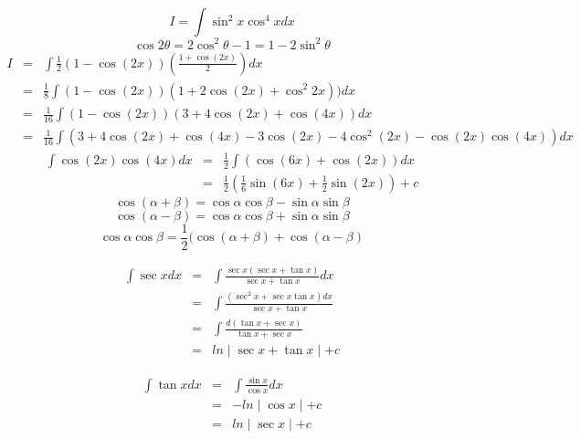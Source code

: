 \begin{eg}
$$\displaystyle I = \int \sin^2 x \cos ^4 x dx$$
$$\cos 2\theta = 2\cos^2 \theta -1 = 1-2\sin^2 \theta$$
$$\begin{array}{rcl}
I & = & \displaystyle \int \frac{1}{2} (1- \cos (2x))(\frac{1+ \cos (2x)}{2}) dx\\
& = & \displaystyle \frac{1}{8} \int (1-\cos (2x))(1+ 2\cos(2x) + \cos^2 2x)) dx\\
& = & \displaystyle \frac{1}{16} \int(1-\cos (2x))(3+4\cos (2x) + \cos(4x)) dx\\
& = & \displaystyle \frac{1}{16} \int (3+ 4\cos (2x) + \cos (4x) - 3 \cos(2x) - 4\cos^2 (2x) - \cos (2x)\cos(4x)) dx
\end{array}$$
$$\begin{array}{rcl}
\displaystyle \int \cos(2x)\cos(4x) dx & = & \displaystyle \frac{1}{2} \int (\cos (6x) + \cos (2x)) dx\\
& = & \displaystyle \frac{1}{2} ( \frac{1}{6} \sin(6x) + \frac{1}{2} \sin (2x)) + c
\end{array}$$
$$\cos (\alpha + \beta) = \cos \alpha \cos \beta - \sin \alpha \sin \beta$$
$$\cos (\alpha - \beta) = \cos \alpha \cos \beta + \sin \alpha \sin \beta$$
$$\displaystyle \cos \alpha \cos \beta = \frac{1}{2}(\cos (\alpha + \beta) + \cos(\alpha - \beta)$$
\end{eg}
\begin{eg}
$$\begin{array}{rcl}
\displaystyle \int \sec x dx & = & \displaystyle \int \frac{\sec x(\sec x + \tan x)}{\sec x + \tan x} dx\\
& = & \displaystyle \int \frac{(\sec^2 x + \sec x \tan x) dx}{\sec x + \tan x}\\
& = & \displaystyle \int \frac{d(\tan x + \sec x)}{\tan x + \sec x}\\
& = & \displaystyle ln \mid \sec x + \tan x \mid + c
\end{array}$$
\end{eg}
\begin{eg}
$$\begin{array}{rcl}
\displaystyle \int \tan x dx & = & \displaystyle \int \frac{\sin x}{\cos x} dx\\
& = & \displaystyle -ln \mid \cos x \mid +c\\
& = & \displaystyle ln \mid \sec x \mid +c
\end{array}$$
\end{eg}
